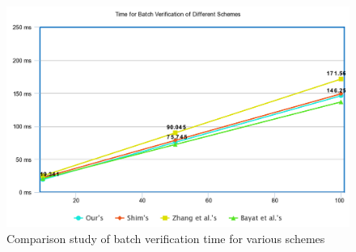 \documentclass[10pt,journal,letterpaper]{IEEEtran}
\begin{document}
\begin{figure}[h]
    \centering
    \captionsetup{justification=centering}
    \includegraphics[scale=0.2]{batch.png}
    \caption{Comparison study of batch verification time for various schemes }
    \label{fig:Batch_Verify}
\end{figure}







\end{document}
